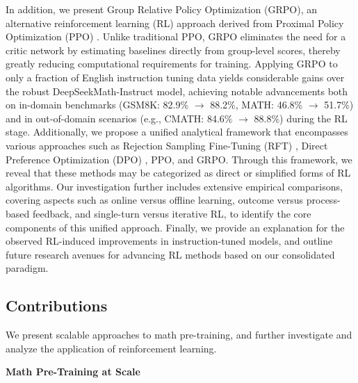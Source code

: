 In addition, we present Group Relative Policy Optimization (GRPO), an alternative reinforcement learning (RL) approach derived from Proximal Policy Optimization (PPO) \citep{schulman2017proximal}. Unlike traditional PPO, GRPO eliminates the need for a critic network by estimating baselines directly from group-level scores, thereby greatly reducing computational requirements for training. Applying GRPO to only a fraction of English instruction tuning data yields considerable gains over the robust DeepSeekMath-Instruct model, achieving notable advancements both on in-domain benchmarks (GSM8K: 82.9\% $\rightarrow$ 88.2\%, MATH: 46.8\% $\rightarrow$ 51.7\%) and in out-of-domain scenarios (e.g., CMATH: 84.6\% $\rightarrow$ 88.8\%) during the RL stage. Additionally, we propose a unified analytical framework that encompasses various approaches such as Rejection Sampling Fine-Tuning (RFT) \citep{yuan2023scaling}, Direct Preference Optimization (DPO) \citep{dpo}, PPO, and GRPO. Through this framework, we reveal that these methods may be categorized as direct or simplified forms of RL algorithms. Our investigation further includes extensive empirical comparisons, covering aspects such as online versus offline learning, outcome versus process-based feedback, and single-turn versus iterative RL, to identify the core components of this unified approach. Finally, we provide an explanation for the observed RL-induced improvements in instruction-tuned models, and outline future research avenues for advancing RL methods based on our consolidated paradigm.

\subsection{Contributions}
We present scalable approaches to math pre-training, and further investigate and analyze the application of reinforcement learning.

\textbf{Math Pre-Training at Scale}


